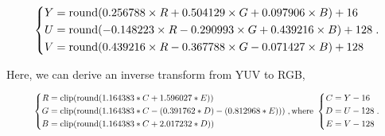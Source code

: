 \begin{equation}
\resizebox{0.9\linewidth}{!}{$
\left\{
\begin{aligned}
Y & = \mathrm{round}( 0.256788 \times R + 0.504129 \times G + 0.097906 \times B) +  16 \\ 
U & = \mathrm{round}(-0.148223 \times R - 0.290993 \times G + 0.439216 \times B) + 128 \\
V & = \mathrm{round}( 0.439216 \times R - 0.367788 \times G - 0.071427 \times B) + 128
\end{aligned}
\right..$}
\end{equation}





Here, we can derive an inverse transform from YUV to RGB, 

\begin{equation}
\resizebox{0.9\linewidth}{!}{$
\left\{
\begin{aligned}
R & = \mathrm{clip}(\mathrm{round}( 1.164383 * C                   + 1.596027 * E  ) ) \\
G & = \mathrm{clip}(\mathrm{round}( 1.164383 * C - (0.391762 * D) - (0.812968 * E) ) ) \\
B & = \mathrm{clip}(\mathrm{round}( 1.164383 * C +  2.017232 * D                   ) ) 
\end{aligned}
\right., \text{where  } 
\left\{
\begin{aligned}
C & = Y - 16 \\ 
D & = U - 128 \\ 
E & = V - 128 \\
\end{aligned}
\right..
\label{eq_yuv2rgb}
$}
\end{equation}

